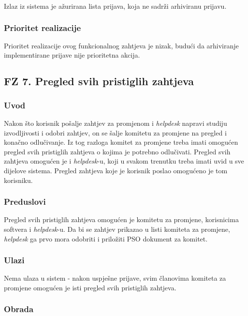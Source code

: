\documentclass[12pt,a4paper]{article}
\begin{document}
Izlaz iz sistema je ažurirana lista prijava, koja ne sadrži arhiviranu prijavu.

\subsubsection{Prioritet realizacije}

Prioritet realizacije ovog funkcionalnog zahtjeva je nizak, budući da arhiviranje implementirane prijave nije prioritetna akcija.

\newpage

\subsection{FZ 7. Pregled svih pristiglih zahtjeva}

\subsubsection{Uvod}

Nakon što korisnik pošalje zahtjev za promjenom i \textit{helpdesk} napravi studiju izvodljivosti i odobri zahtjev, on se šalje komitetu za promjene na pregled i konačno odlučivanje. Iz tog razloga komitet za promjene treba imati omogućen pregled svih pristiglih zahtjeva o kojima je potrebno odlučivati. Pregled svih zahtjeva omogućen je i \textit{helpdesk}-u, koji u svakom trenutku treba imati uvid u sve dijelove sistema. Pregled zahtjeva koje je korisnik poslao omogućeno je tom korisniku.

\subsubsection{Preduslovi}

Pregled svih pristiglih zahtjeva omogućen je komitetu za promjene, korisnicima softvera i \textit{helpdesk}-u. Da bi se zahtjev prikazao u listi komiteta za promjene, \textit{helpdesk} ga prvo mora odobriti i priložiti PSO dokument za komitet.

\subsubsection{Ulazi}

Nema ulaza u sistem - nakon uspješne prijave, svim članovima komiteta za promjene omogućen je isti pregled svih pristiglih zahtjeva.

\subsubsection{Obrada}
\end{document}
